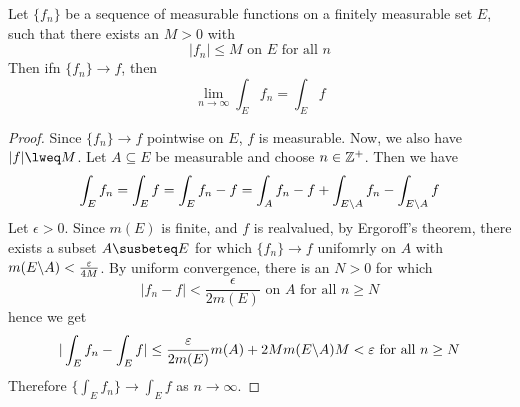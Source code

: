 \begin{theorem}\label{10.1.7}
    Let $\{f_n\}$ be a sequence of measurable functions on a finitely
    measurable set $E$, such that there exists an $M>0$ with
    \begin{equation*}
        |f_n| \leq M \text{ on } E \text{ for all } n
    \end{equation*}
    Then ifn $\{f_n\} \xrightarrow{} f$, then
    \begin{equation*}
        \lim_{n \xrightarrow{} \infty}{\int_E{f_n}}=\int_E{f}
    \end{equation*}
\end{theorem}
\begin{proof}
    Since $\{f_n\} \xrightarrow{} f$ pointwise on $E$,  $f$ is measurable. Now,
    we also have $|f| \lweq M$. Let $A \subseteq E$ be measurable and choose  $n
    \in \mathbb{Z}^+$. Then we have
    \begin{equation*}
        \int_E{f_n}=\int_E{f}=\int_E{f_n-f}=
        \int_A{f_n-f}+\int_{E \backslash A}{f_n}-\int_{E \backslash A}{f}
    \end{equation*}
    Let $\epsilon>0$. Since  $m(E)$ is finite, and $f$ is realvalued, by
    Ergoroff's theorem, there exists a subset  $A \susbeteq E$ for which
    $\{f_n\} \xrightarrow{} f$ unifomrly on $A$ with
    $m(E \backslash A)<\frac{\varepsilon}{4M}$. By uniform convergence, there is an
    $N>0$ for which
    \begin{equation*}
        |f_n-f|<\frac{\epsilon}{2m(E)} \text{ on } A \text{ for all } n \geq N
    \end{equation*}
    hence we get
    \begin{equation*}
        |\int_E{f_n}-\int_E{f}| \leq
        \frac{\varepsilon}{2m(E)}m(A)+2Mm(E \backslash A)M<\varepsilon \text{ for all } n
        \geq N
    \end{equation*}
    Therefore $\{\int_E{f_n}\} \xrightarrow{} \int_E{f}$ as $n \xrightarrow{}
    \infty$.
\end{proof}
